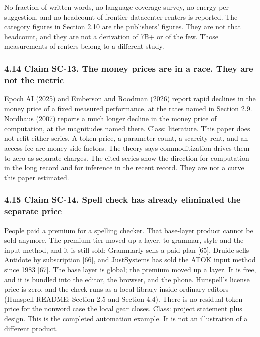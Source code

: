 \documentclass[
  10pt,
]{article}
\begin{document}
No fraction of written words, no language-coverage survey, no energy per
suggestion, and no headcount of frontier-datacenter renters is reported.
The category figures in Section 2.10 are the publishers' figures. They
are not that headcount, and they are not a derivation of 7B+ or of the
few. Those measurements of renters belong to a different study.

\subsubsection{4.14 Claim SC-13. The money prices are in a race. They
are not the
metric}\label{claim-sc-13.-the-money-prices-are-in-a-race.-they-are-not-the-metric}

Epoch AI (2025) and Emberson and Roodman (2026) report rapid declines in
the money price of a fixed measured performance, at the rates named in
Section 2.9. Nordhaus (2007) reports a much longer decline in the money
price of computation, at the magnitudes named there. Class: literature.
This paper does not refit either series. A token price, a parameter
count, a scarcity rent, and an access fee are money-side factors. The
theory says commoditization drives them to zero as separate charges. The
cited series show the direction for computation in the long record and
for inference in the recent record. They are not a curve this paper
estimated.

\subsubsection{4.15 Claim SC-14. Spell check has already eliminated the
separate
price}\label{claim-sc-14.-spell-check-has-already-eliminated-the-separate-price}

People paid a premium for a spelling checker. That base-layer product
cannot be sold anymore. The premium tier moved up a layer, to grammar,
style and the input method, and it is still sold: Grammarly sells a paid
plan {[}65{]}, Druide sells Antidote by subscription {[}66{]}, and
JustSystems has sold the ATOK input method since 1983 {[}67{]}. The base
layer is global; the premium moved up a layer. It is free, and it is
bundled into the editor, the browser, and the phone. Hunspell's license
price is zero, and the check runs as a local library inside ordinary
editors (Hunspell README; Section 2.5 and Section 4.4). There is no
residual token price for the nonword case the local gear closes. Class:
project statement plus design. This is the completed automation example.
It is not an illustration of a different product.
\end{document}
